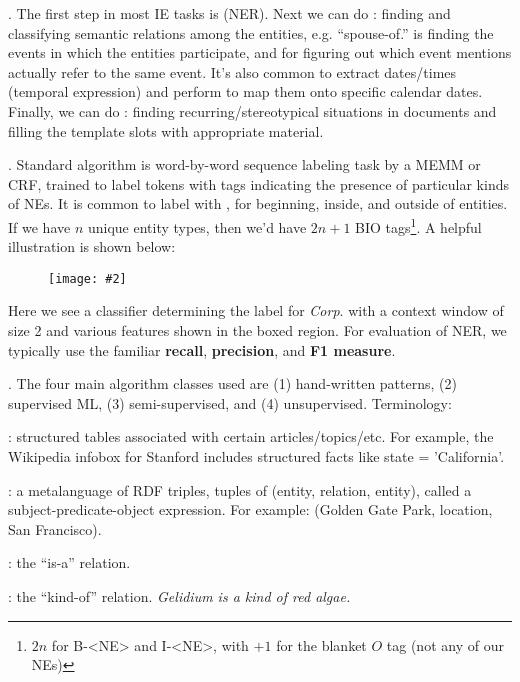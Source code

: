 \documentclass[11pt]{article}
\newcommand\myfig[2][0.3\textwidth]{\begin{figure}[h!]\centering\texttt{[image: \#2]}\end{figure}}
\newcommand\myspace[1][]{\vspace{#1\bigskipamount}}
\newcommand\p{\Needspace{10\baselineskip} \noindent}
\begin{document}

\p {}. The first step in most IE tasks is  (NER). Next we can do : finding and classifying semantic relations among the entities, e.g. ``spouse-of.''  is finding the events in which the entities participate, and  for figuring out which event mentions actually refer to the same event. It's also common to extract dates/times (temporal expression) and perform  to map them onto specific calendar dates. Finally, we can do : finding recurring/stereotypical situations in documents and filling the template slots with appropriate material.

\myspace
\p {}. Standard algorithm is word-by-word sequence labeling task by a MEMM or CRF, trained to label tokens with tags indicating the presence of particular kinds of NEs. It is common to label with , for beginning, inside, and outside of entities. If we have $n$ unique entity types, then we'd have $2n + 1$ BIO tags\footnote{$2n$ for B-<NE> and I-<NE>, with $+1$ for the blanket $O$ tag (not any of our NEs)}. A helpful illustration is shown below:

\myfig[0.7\textwidth]{ner-labeling.png} 

Here we see a classifier determining the label for \textit{Corp}. with a context window of size 2 and various features shown in the boxed region. For evaluation of NER, we typically use the familiar \textbf{recall}, \textbf{precision}, and \textbf{F1 measure}. 


\myspace
\p {}. The four main algorithm classes used are (1) hand-written patterns, (2) supervised ML, (3) semi-supervised, and (4) unsupervised. Terminology:
\begin{compactitem}
	\item {}: structured tables associated with certain articles/topics/etc. For example, the Wikipedia infobox for Stanford includes structured facts like state = 'California'. 
	
	\item {}: a metalanguage of RDF triples, tuples of (entity, relation, entity), called a subject-predicate-object expression. For example: (Golden Gate Park, location, San Francisco). 
	
	\item {}: the ``is-a'' relation. 
	
	\item {}: the ``kind-of'' relation. \textit{Gelidium is a kind of red algae.}
\end{compactitem}
\vspace{1em}
\end{document}
